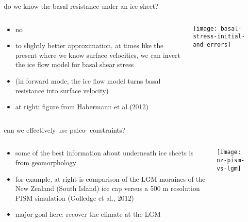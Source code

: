 \documentclass[hide notes,intlimits]{beamer}
\begin{document}


\begin{frame}{do we know the basal resistance under an ice sheet?}

\begin{columns}
\begin{column}{0.55\textwidth}
\vspace{-0.3in}
\begin{itemize}
\item no
\item to slightly better approximation, at times like the present where we know surface velocities, we can \alert{invert} the ice flow model for basal shear stress
\item (in forward mode, the ice flow model turns basal resistance into surface velocity)
\item \alert{at right:} figure from Habermann et al (2012)
\end{itemize}
\end{column}

\begin{column}{0.45\textwidth}
\vspace{-0.1in}
  \texttt{[image: basal-stress-initial-and-errors]}
\end{column}
\end{columns}
\end{frame}



\begin{frame}{can we effectively use paleo- constraints?}

\begin{columns}
\begin{column}{0.45\textwidth}
\begin{itemize}
\item some of the best information about underneath ice sheets is from geomorphology
\item for example, \alert{at right} is comparison of the LGM moraines of the New Zealand (South Island) ice cap versus a 500 m resolution PISM simulation (Golledge et al., 2012)
\item major goal here: recover the climate at the LGM
\end{itemize}
\end{column}

\begin{column}{0.55\textwidth}
\vspace{-0.1in}
  \texttt{[image: nz-pism-vs-lgm]}
\end{column}
\end{columns}
\end{frame}
\end{document}
